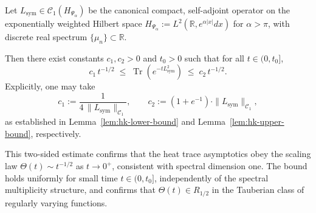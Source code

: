 \begin{proposition}
\label{prop:two_sided_heat_trace_bounds}
Let \( L_{\mathrm{sym}} \in \mathcal{C}_1(H_{\Psi_\alpha}) \) be the canonical compact, self-adjoint operator on the exponentially weighted Hilbert space \( H_{\Psi_\alpha} := L^2(\mathbb{R}, e^{\alpha|x|} dx) \) for \( \alpha > \pi \), with discrete real spectrum \( \{\mu_n\} \subset \mathbb{R} \).

Then there exist constants \( c_1, c_2 > 0 \) and \( t_0 > 0 \) such that for all \( t \in (0, t_0] \),
\[
c_1\, t^{-1/2}
\;\le\;
\operatorname{Tr}\left( e^{-t L_{\mathrm{sym}}^2} \right)
\;\le\;
c_2\, t^{-1/2}.
\]
Explicitly, one may take
\[
c_1 := \frac{1}{4 \, \| L_{\mathrm{sym}} \|_{\mathcal{C}_1}}, \qquad
c_2 := (1 + e^{-1}) \cdot \| L_{\mathrm{sym}} \|_{\mathcal{C}_1},
\]
as established in Lemma~\ref{lem:hk-lower-bound} and Lemma~\ref{lem:hk-upper-bound}, respectively.

\medskip

\noindent
This two-sided estimate confirms that the heat trace asymptotics obey the scaling law \( \Theta(t) \sim t^{-1/2} \) as \( t \to 0^+ \), consistent with spectral dimension one. The bound holds uniformly for small time \( t \in (0, t_0] \), independently of the spectral multiplicity structure, and confirms that \( \Theta(t) \in R_{1/2} \) in the Tauberian class of regularly varying functions.
\end{proposition}
